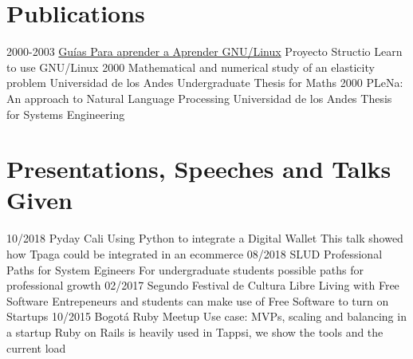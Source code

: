 \section{Publications}
\begin{entrylist}
  \entry
    {2000-2003}
    {\href{http://structio.sourceforge.net/guias/AA_Linux_colegio/AA_Linux_colegio.html}{Guías Para aprender a Aprender GNU/Linux}}
    {Proyecto Structio}
    {Learn to use GNU/Linux}
  \entry
    {2000}
    {Mathematical and numerical study of an
    elasticity problem}
    {Universidad de los Andes}
    {Undergraduate Thesis for Maths}
  \entry
    {2000}
    {PLeNa: An approach to Natural Language
    Processing}
    {Universidad de los Andes}
    {Thesis for Systems Engineering}
\end{entrylist}

\section{Presentations, Speeches and Talks Given}
\begin{entrylist}
  \entry
    {10/2018}
    {Pyday Cali}
    {Using Python to integrate a Digital Wallet}
    {This talk showed how Tpaga could be integrated in an ecommerce}
  \entry
    {08/2018}
    {SLUD}
    {Professional Paths for System Egineers}
    {For undergraduate students possible paths for professional growth}
  \entry
    {02/2017}
    {Segundo Festival de Cultura Libre}
    {Living with Free Software}
    {Entrepeneurs and students can make use of Free Software to turn on Startups}
  \entry
    {10/2015}
    {Bogotá Ruby Meetup}
    {Use case: MVPs, scaling and balancing in a startup}
    {Ruby on Rails is heavily used in Tappsi, we show the tools and the current load}
\end{entrylist}
